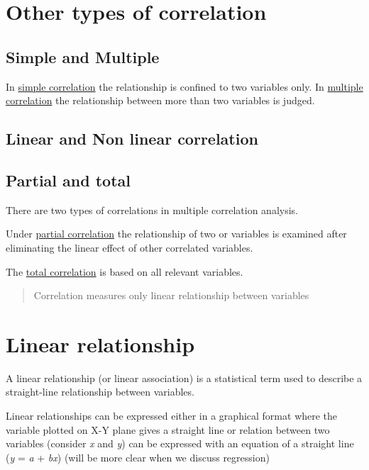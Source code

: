 \documentclass[
]{book}
\begin{document}
\hypertarget{other-types-of-correlation}{%
\section{Other types of correlation}\label{other-types-of-correlation}}

\hypertarget{simple-and-multiple}{%
\subsection{Simple and Multiple}\label{simple-and-multiple}}

In \ul{simple correlation} the relationship is confined to two
variables only. In \ul{multiple correlation} the relationship
between more than two variables is judged.

\hypertarget{linear-and-non-linear-correlation}{%
\subsection{Linear and Non linear correlation}\label{linear-and-non-linear-correlation}}

\hypertarget{partial-and-total}{%
\subsection{Partial and total}\label{partial-and-total}}

There are two types of correlations in multiple correlation analysis.

Under \ul{partial correlation} the relationship of two or
variables is examined after eliminating the linear effect of other
correlated variables.

The \ul{total correlation} is based on all relevant variables.

\begin{quote}
Correlation measures only linear relationship between variables
\end{quote}

\hypertarget{linear-relationship}{%
\section{Linear relationship}\label{linear-relationship}}

A linear relationship (or linear association) is a statistical term used
to describe a straight-line relationship between variables.

Linear relationships can be expressed either in a graphical format where
the variable plotted on X-Y plane gives a straight line or relation
between two variables (consider \emph{x} and \emph{y}) can be expressed with an
equation of a straight line (\emph{y} = \emph{a} + \emph{bx}) (will be more clear when
we discuss regression)
\end{document}
